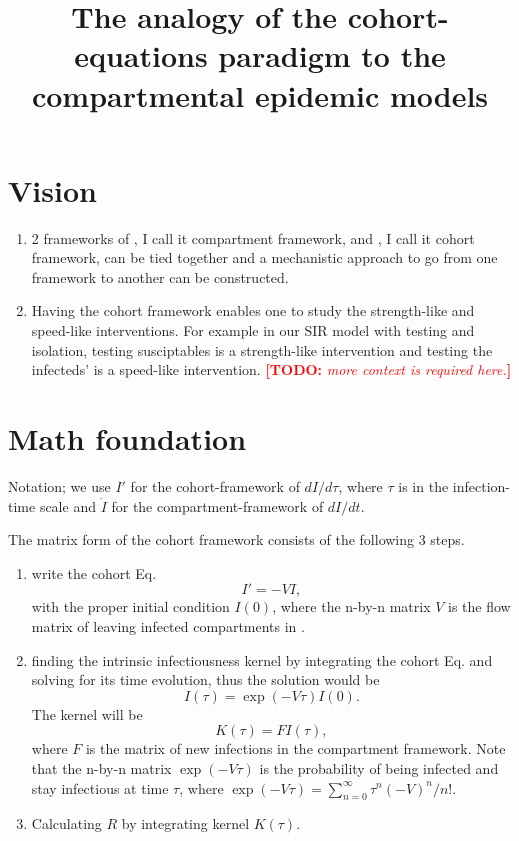 \documentclass[12pt]{article}
\title{The analogy of the cohort-equations paradigm to the compartmental epidemic models}
\newcommand{\todo}[1]{\comment{red}{TODO}{#1}}
\newcommand{\comment}{\showcomment}
\newcommand{\showcomment}[3]{\textcolor{#1}{\textbf{[#2: }\textsl{#3}\textbf{]}}}
\theoremstyle{definition} %
\begin{document}
\maketitle
\linenumbers
\section{Vision}
\begin{enumerate}
\item 2 frameworks of \cite{van2002reproduction}, I call it compartment framework, and \cite{champredon2018equivalence}, I call it cohort framework, can be tied together and a mechanistic approach to go from one framework to another can be constructed.

\item Having the cohort framework enables one to study the strength-like and speed-like interventions. For example in our SIR model with testing and isolation, testing susciptables is a strength-like intervention and testing the infecteds' is a speed-like intervention. \todo{more context is required here.}
\end{enumerate}

\section{Math foundation}
Notation; we use $I'$ for the cohort-framework of $dI/d\tau$, where $\tau$ is in the infection-time scale and $\dot I$ for the compartment-framework of $dI/dt$. 

The matrix form of the cohort framework consists of the following 3 steps.
\begin{enumerate}[step 1]
\item
write the cohort Eq. 
\begin{equation}
\label{eq:cohort}
I'=-V I,
\end{equation}
 with the proper initial condition $I(0)$, where the n-by-n matrix $V$ is the flow matrix of leaving infected compartments in \cite{van2002reproduction}.

\item 
finding the intrinsic infectiousness kernel by integrating the cohort Eq. and solving for its time evolution, thus
the solution would be 
\begin{equation}
\label{eq:I}
I(\tau) = \exp(-V\tau) I(0).
\end{equation}
The kernel will be 
\begin{equation}
\label{eq:kernel}
K(\tau) = F I(\tau), 
\end{equation}
where $F$ is the matrix of new infections in the compartment framework.
Note that the n-by-n matrix $\exp(-V\tau)$ is the probability of being infected and stay infectious at time $\tau$, where
$\exp(-V\tau)=\sum_{n=0}^\infty \tau^n (-V)^n/n!$.

\item
Calculating $R$ by integrating kernel $K(\tau)$.
\end{enumerate}
\end{document}

